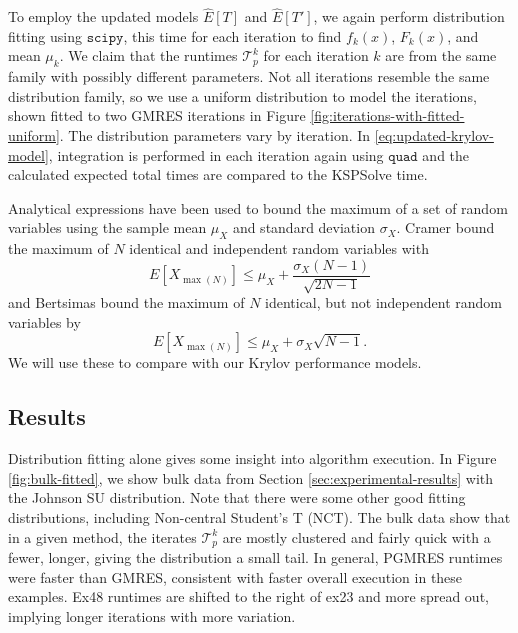 \documentclass[num-refs]{wiley-article}
\begin{document}
To employ the updated models $\widehat{E}[T]$ and $\widehat{E}[T']$, we again perform distribution fitting using ${\texttt{scipy}}$, this time for each iteration to find  $f_k(x)$, $F_k(x)$, and mean $\mu_k$.
We claim that the runtimes $\mathcal{T}^k_p$ for each iteration $k$ are from the same family with possibly different parameters. 
Not all iterations resemble the same distribution family, so we use a uniform distribution to model the iterations, shown fitted to two GMRES iterations in Figure \ref{fig:iterations-with-fitted-uniform}. 
The distribution parameters vary by iteration.
In \eqref{eq:updated-krylov-model}, integration is performed in each iteration again using ${\texttt{quad}}$ and the calculated expected total times are compared to the KSPSolve time.




Analytical expressions have been used \cite{seelam2010extreme} to bound the maximum of a set of random variables using the sample mean $\mu_X$ and standard deviation $\sigma_X$.  Cramer \cite{cramer2016mathematical, david2004order} bound the maximum of $N$ identical and independent random variables  with
\begin{equation}
E[X_{\max{(N)}}] \leq \mu_X + \frac{\sigma_X (N-1)}{\sqrt{2N-1}}
\end{equation}
and Bertsimas \cite{bertsimas2006tight} bound the maximum of $N$ identical, but not independent random variables by
\begin{equation}
E[X_{\max{(N)}}] \leq \mu_X + \sigma_X \sqrt{N-1}.
\end{equation}
We will use these to compare with our Krylov performance models.

\subsection{Results}

Distribution fitting alone gives some insight into algorithm execution. 
In Figure \ref{fig:bulk-fitted}, we show bulk data from Section \ref{sec:experimental-results} with the Johnson SU distribution. Note that there were some other good fitting distributions, including Non-central Student's T (NCT).
The bulk data show that in a given method, the iterates $\mathcal{T}^k_p$ are mostly clustered and fairly quick with a fewer, longer, giving the distribution a small tail.
In general, PGMRES runtimes were faster than GMRES, consistent with faster overall execution in these examples. Ex48 runtimes are shifted to the right of ex23 and more spread out, implying longer iterations with more variation. 
\end{document}
